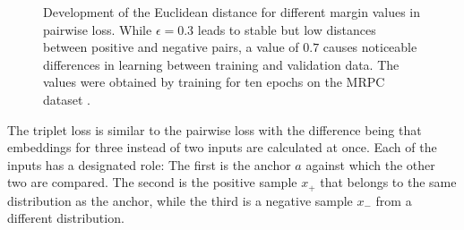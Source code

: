 \documentclass[11pt]{article}
\begin{document}
\begin{figure}[!tbp]
  \centering
  \caption{Development of the Euclidean distance for different margin values in pairwise loss. 
  While $\epsilon=0.3$ leads to stable but low distances between positive and negative pairs, a value of $0.7$ causes noticeable differences in learning between training and validation data. 
  The values were obtained by training for ten epochs on the MRPC dataset \cite{dolan:2005}.}
  \label{fig:dist_dev}
\end{figure}
The triplet loss is similar to the pairwise loss with the difference being that embeddings for three instead of two inputs are calculated at once.
Each of the inputs has a designated role: 
The first is the anchor $a$ against which the other two are compared. 
The second is the positive sample $x_+$ that belongs to the same distribution as the anchor, while the third is a negative sample $x_-$ from a different distribution.
\end{document}
